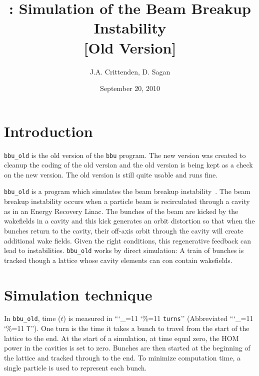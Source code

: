 \documentclass[11pt]{article}
\title{\bbup: Simulation of the Beam Breakup Instability \\{}
                  [Old Version] }
\author{J.A. Crittenden, D. Sagan}
\date{September 20, 2010}
\newcommand{\bbup}{\texttt{bbu_old}\xspace}
\newcommand\ttcmd{\begingroup\catcode`\_=11 \catcode`\%=11 \dottcmd}
\newcommand\dottcmd[1]{\texttt{#1}\endgroup}
\newcommand{\vn}{\ttcmd}
\begin{document}
\maketitle

\section{Introduction} 

\bbup is the old version of the \texttt{bbu} program. The new version
was created to cleanup the coding of the old version and the old
version is being kept as a check on the new version. The old version
is still quite usable and runs fine.

\bbup is a program which simulates the beam breakup
instability~\cite{ref:Hoffstaetter04}. The beam breakup instability
occurs when a particle beam is recirculated through a cavity as in an
Energy Recovery Linac. The bunches of the beam are kicked by the
wakefields in a cavity and this kick generates an orbit distortion so
that when the bunches return to the cavity, their off-axis orbit
through the cavity will create additional wake fields. Given the right
conditions, this regenerative feedback can lead to instabilities.
\bbup works by direct simulation: A train of bunches is tracked though 
a lattice whose cavity elements can con contain wakefields.

\section{Simulation technique}

In \bbup, time ($t$) is measured in ``\vn{turns}'' (Abbreviated
``\vn{T}''). One turn is the time it takes a bunch to travel from the
start of the lattice to the end. At the start of a simulation, at time
equal zero, the HOM power in the cavities is set to zero. Bunches are
then started at the beginning of the lattice and tracked through to
the end. To minimize computation time, a single particle is used to
represent each bunch. 
\end{document}
